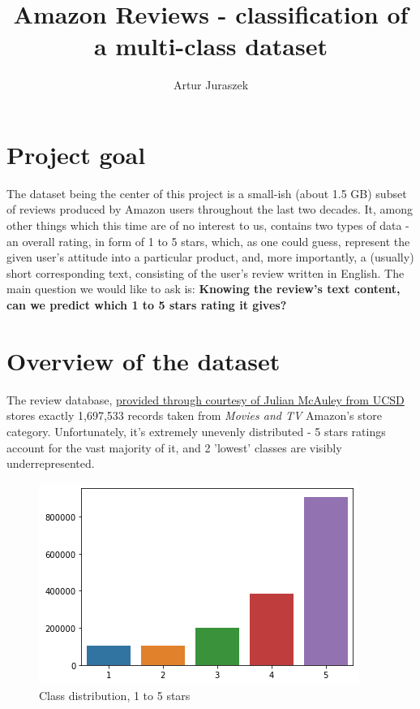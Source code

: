 \documentclass[letterpaper]{article}
\begin{document}
\title{Amazon Reviews - classification of a multi-class  dataset}
\author{Artur Juraszek}
\maketitle

\section{Project goal}
The dataset being the center of this project is a small-ish (about 1.5 GB) subset of reviews produced by
Amazon users throughout the last two decades.
It, among other things which this time are of no interest to us, contains two types of data - an overall
rating, in form of 1 to 5 stars, which, as one could guess, represent the given user's attitude into
a particular product, and, more importantly, a (usually) short corresponding text, consisting of
the user's review written in English. The main question we would like to ask is: \textbf{Knowing the 
review's text content, can we predict which 1 to 5 stars rating it gives?}

\section{Overview of the dataset}
The review database, \href{http://jmcauley.ucsd.edu/data/amazon/}{provided
through courtesy of Julian McAuley from UCSD} stores exactly 1,697,533 records taken from
\textit{Movies and TV} Amazon's store category. Unfortunately, it's extremely unevenly
distributed - 5 stars ratings account for the vast majority of it, and 2 'lowest' classes
are visibly underrepresented.

\begin{figure}[h]
    \centering
    \includegraphics[scale=0.5]{dataset-distribution.png}
    \caption{Class distribution, 1 to 5 stars}
\end{figure}
\end{document}
